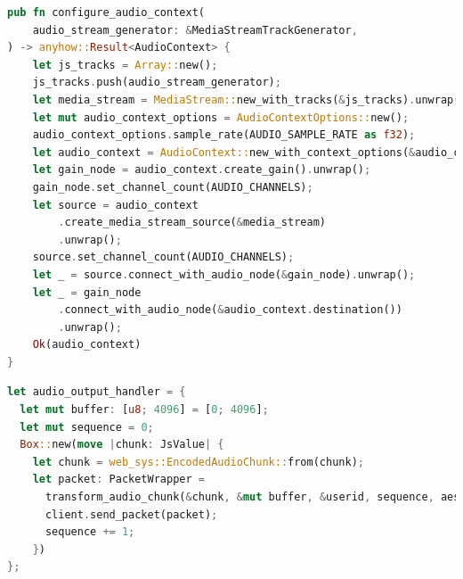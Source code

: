 \documentclass{article}
\begin{document}
\begin{lstlisting}[language=Rust, style=boxed, label={lst:decoder-params}, captionpos=b,caption={Configurazione audio stereo per il decoder OPUS}]
pub fn configure_audio_context(
    audio_stream_generator: &MediaStreamTrackGenerator,
) -> anyhow::Result<AudioContext> {
    let js_tracks = Array::new();
    js_tracks.push(audio_stream_generator);
    let media_stream = MediaStream::new_with_tracks(&js_tracks).unwrap();
    let mut audio_context_options = AudioContextOptions::new();
    audio_context_options.sample_rate(AUDIO_SAMPLE_RATE as f32);
    let audio_context = AudioContext::new_with_context_options(&audio_context_options).unwrap();
    let gain_node = audio_context.create_gain().unwrap();
    gain_node.set_channel_count(AUDIO_CHANNELS);
    let source = audio_context
        .create_media_stream_source(&media_stream)
        .unwrap();
    source.set_channel_count(AUDIO_CHANNELS);
    let _ = source.connect_with_audio_node(&gain_node).unwrap();
    let _ = gain_node
        .connect_with_audio_node(&audio_context.destination())
        .unwrap();
    Ok(audio_context)
}

\end{lstlisting}


\begin{lstlisting}[language=Rust, style=boxed, label={lst:encoder-buffer-size}, captionpos=b,caption={Riduzione del buffer size per l'encoder OPUS}]
let audio_output_handler = {
  let mut buffer: [u8; 4096] = [0; 4096];
  let mut sequence = 0;
  Box::new(move |chunk: JsValue| {
    let chunk = web_sys::EncodedAudioChunk::from(chunk);
    let packet: PacketWrapper =
      transform_audio_chunk(&chunk, &mut buffer, &userid, sequence, aes.clone());
      client.send_packet(packet);
      sequence += 1;
    })
};

\end{lstlisting}
\end{document}

